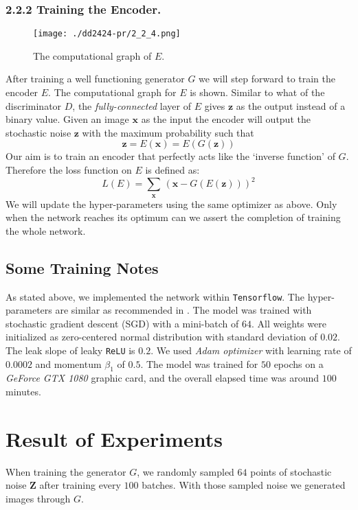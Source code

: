 \documentclass[runningheads]{llncs}
\begin{document}
\subsubsection*{2.2.2 Training the Encoder.\ }
\begin{figure}
\begin{center}
\texttt{[image: ./dd2424-pr/2\_2\_4.png]}
\caption{The computational graph of $E$.}
\end{center}
\end{figure}
After training a well functioning generator $G$ we will step forward to train the encoder $E$. The computational graph for $E$ is shown. Similar to what of the discriminator $D$, the \textit{fully-connected} layer of $E$ gives $\mathbf{z}$ as the output instead of a binary value. Given an image $\mathbf{x}$ as the input the encoder will output the stochastic noise $\mathbf{z}$ with the maximum probability such that
\begin{equation}
\mathbf{z}=E(\mathbf{x})=E(G(\mathbf{z}))
\end{equation}
Our aim is to train an encoder that perfectly acts like the `inverse function' of $G$. Therefore the loss function on $E$ is defined as:
\begin{equation}
L(E)=\sum_{\mathbf{x}}\,(\mathbf{x}-G(E(\mathbf{z})))^2
\end{equation}
We will update the hyper-parameters using the same optimizer as above. Only when the network reaches its optimum can we assert the completion of training the whole network.

\subsection{Some Training Notes}
As stated above, we implemented the network within \texttt{Tensorflow}. The hyper-parameters are similar as recommended in \cite{radford_metz_chintala_2016}. The model was trained with stochastic gradient descent (SGD) with a mini-batch of $64$. All weights were initialized as zero-centered normal distribution with standard deviation of $0.02$. The leak slope of leaky \texttt{ReLU} is $0.2$. We used \textit{Adam optimizer} with learning rate of $0.0002$ and momentum $\beta_1$ of $0.5$. The model was trained for $50$ epochs on a \textit{GeForce GTX 1080} graphic card, and the overall elapsed time was around $100$ minutes.

\section{Result of Experiments}
When training the generator $G$, we randomly sampled $64$ points of stochastic noise $\mathbf{Z}$ after training every $100$ batches. With those sampled noise we generated images through $G$.
\end{document}
